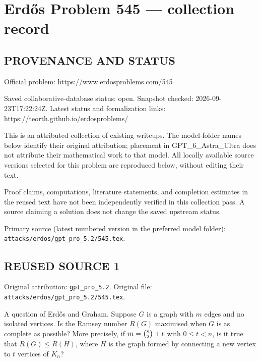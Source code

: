 \section*{Erd\H{o}s Problem 545 --- collection record}

\subsection*{PROVENANCE AND STATUS}
Official problem: https://www.erdosproblems.com/545

Saved collaborative-database status: open.
Snapshot checked: 2026-09-23T17:22:24Z.
Latest status and formalization links: https://teorth.github.io/erdosproblems/

This is an attributed collection of existing writeups. The model-folder names below identify their original attribution; placement in GPT\_6\_Astra\_Ultra does not attribute their mathematical work to that model. All locally available source versions selected for this problem are reproduced below, without editing their text.

Proof claims, computations, literature statements, and completion estimates in the reused text have not been independently verified in this collection pass. A source claiming a solution does not change the saved upstream status.

Primary source (latest numbered version in the preferred model folder): \texttt{attacks/erdos/gpt\_pro\_5.2/545.tex}.

\subsection*{REUSED SOURCE 1}
Original attribution: \texttt{gpt\_pro\_5.2}.
Original file: \texttt{attacks/erdos/gpt\_pro\_5.2/545.tex}.



A question of Erd\H{o}s and Graham. Suppose $G$ is a graph with $m$ edges and no isolated vertices. Is the Ramsey number $R(G)$ maximised when $G$ is as complete as possible? More precisely, if $m=\tbinom{n}{2}+t$ with $0\leq t<n$, is it true that $R(G)\leq R(H)$, where $H$ is the graph formed by connecting a new vertex to $t$ vertices of $K_n$? 


